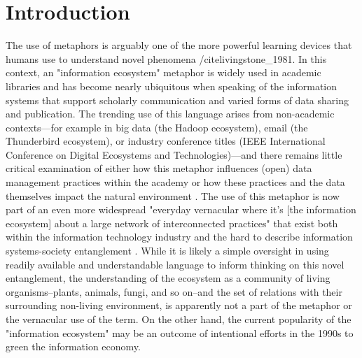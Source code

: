 \section{Introduction}

The use of metaphors is arguably one of the more powerful learning devices that humans use to understand novel phenomena /cite{livingstone_1981}. In this context, an "information ecosystem" metaphor is widely used in academic libraries and has become nearly ubiquitous when speaking of the information systems that support scholarly communication and varied forms of data sharing and publication. The trending use of this language arises from non-academic contexts—for example in big data (the Hadoop ecosystem), email (the Thunderbird ecosystem), or industry conference titles (IEEE International Conference on Digital Ecosystems and Technologies)—and there remains little critical examination of either how this metaphor influences (open) data management practices within the academy or how these practices and the data themselves impact the natural environment \cite[although for contributions from human ecology see][]{stepp_1999}. The use of this metaphor is now part of an even more widespread "everyday vernacular where it’s [the information ecosystem] about a large network of interconnected practices" that exist both within the information technology industry and the hard to describe information systems-society entanglement \cite{boyd_2016}. While it is likely a simple oversight in using readily available and understandable language to inform thinking on this novel entanglement, the understanding of the ecosystem as a community of living organisms--plants, animals, fungi, and so on--and the set of relations with their surrounding non-living environment, is apparently not a part of the metaphor or the vernacular use of the term. On the other hand, the current popularity of the "information ecosystem" may be an outcome of intentional efforts in the 1990s to green the information economy.


